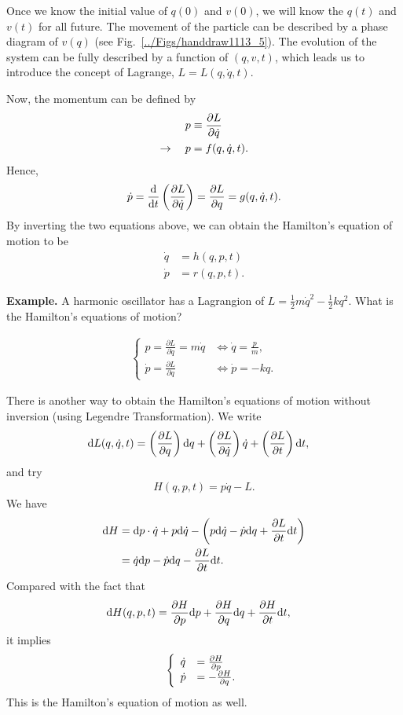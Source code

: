Once we know the initial value of $ q(0) $ and $ v(0) $, we will know the $ q(t) $ and $ v(t) $ for all future. The movement of the particle can be described by a phase diagram of $ v(q) $ (see Fig.~\ref{../Figs/handdraw1113_5}). The evolution of the system can be fully described by a function of $ (q,v,t) $, which leads us to introduce the concept of Lagrange, $ L=L(q,\dot{q},t) $. 

Now, the momentum can be defined by
\begin{align}
p &\equiv \frac{\partial {L}}{\partial {\dot{q}}}\\
\rightarrow \quad p &= f(q,\dot{q},t).
\end{align}
Hence, 
\begin{align}
\dot{p}= \frac{{\mathrm d} {}}{{\mathrm d}t}\left( \frac{\partial {L}}{\partial {\dot{q}}} \right)=\frac{\partial {L}}{\partial {q}} = g(q,\dot{q},t).
\end{align}
By inverting the two equations above, we can obtain the Hamilton's equation of motion to be
\begin{align}
\dot{q} &= h(q,p,t)\\
\dot{p} &= r(q,p,t).
\end{align}





\textbf{Example. }A harmonic oscillator has a Lagrangion of  $L=\frac{1}{2}m\dot{q}^{2}-\frac{1}{2}kq^{2}$. What is the Hamilton's equations of motion?

\begin{align}
\left\{ \begin{array}{ll}
p=\frac{\partial L}{\partial\dot{q}}=m\dot{q} & \iff\dot{q}=\frac{p}{m},\\
\dot{p}=\frac{\partial L}{\partial q} & \iff\dot{p}=-kq.
\end{array}\right.
\end{align}

There is another way to obtain the Hamilton's equations of motion without inversion (using Legendre Transformation).
We write
\begin{align}
\mathrm{d} L(q,\dot{q},t) &= \left(\frac{\partial {L}}{\partial {q}}\right)\mathrm{d} q + \left(\frac{\partial {L}}{\partial {\dot{q}}} \right)\dot{q} + \left(\frac{\partial {L}}{\partial t} \right)\mathrm{d} t,
\end{align}
and try 
\begin{align}
\boxed{H(q,p,t) = p\dot{q}-L}.
\end{align}
We have
\begin{align}
\mathrm{d} H &= \mathrm{d} p \cdot \dot{q} + p\mathrm{d} \dot{q} -\left( p\mathrm{d} \dot{q}-\dot{p}\mathrm{d} q + \frac{\partial {L}}{\partial t} \mathrm{d} t \right)\\
&= \dot{q} \mathrm{d} p -\dot{p} \mathrm{d} q -\frac{\partial {L}}{\partial t} \mathrm{d} t.
\end{align}
Compared with the fact that
\begin{align}
\mathrm{d} H(q,p,t) &= \frac{\partial {H}}{\partial {p}}\mathrm{d} p + \frac{\partial {H}}{\partial {q}}\mathrm{d} q + \frac{\partial {H}}{\partial t}\mathrm{d} t,
\end{align}
it implies
\begin{align}
\left\{ \begin{array}{ll}
\dot{q} &=\frac{\partial {H}}{\partial {p}}\\
\dot{p} &= -\frac{\partial {H}}{\partial {q}}.
\end{array}\right.
\end{align}
This is the Hamilton's equation of motion as well.

